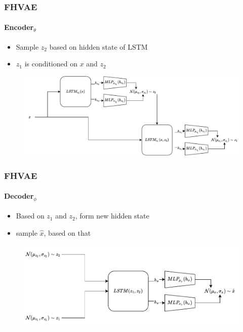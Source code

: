 \documentclass[9pt]{beamer}
\begin{document}
\begin{frame}
\frametitle{FHVAE}
\framesubtitle{Encoder$_{\theta}$}
\begin{itemize}
	\item Sample $z_2$ based on hidden state of LSTM
	\item $z_1$ is conditioned on $x$ and $z_2$
\end{itemize}
\begin{figure}
	\includegraphics[width=1\linewidth]{figures/fhvae_encoder.pdf}
\end{figure}
\end{frame} 

\begin{frame}
\frametitle{FHVAE}
\framesubtitle{Decoder$_{\phi}$}
\begin{itemize}
	\item Based on $z_1$ and $z_2$, form new hidden state
	\item sample $\hat{x}$, based on that
\end{itemize}
\begin{figure}
	\includegraphics[width=.8\linewidth]{figures/fhvae_decoder.pdf}
\end{figure}
\end{frame} 
\end{document}
